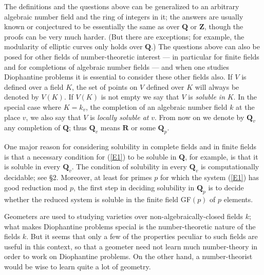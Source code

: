 \documentclass[12pt]{article}
\def\bQ{{\mathbf Q}}
\def\bR{{\mathbf R}}
\def\bZ{{\mathbf Z}}
\begin{document}
The definitions and the questions above can be generalized to an arbitrary
algebraic number field and the ring of integers in it; the answers are
usually known or conjectured to be essentially the same as over $\bQ$ or
$\bZ$, though the proofs can be very much harder. (But there are exceptions;
for example, the modularity of elliptic curves only holds over $\bQ$.)
The questions above can also be posed for other fields of
number-theoretic interest --- in particular for finite fields and for
completions of algebraic number fields --- and when one studies Diophantine
problems it is essential to consider these other fields also.
If $V$ is defined over a field $K$, the set of points on $V$ defined over $K$
will always be denoted by $V(K)$. If $V(K)$ is not empty we say that $V$ is
\emph{soluble in} $K$. In the special case where $K=k_v$, the completion of
an algebraic number field $k$ at the place $v$, we also say that $V$ is
\emph{locally soluble at} $v$. From now on we denote by
$\bQ_v$ any completion of $\bQ$; thus $\bQ_v$ means $\bR$ or some $\bQ_p$.

One major reason for considering solubility in complete fields and in finite
fields
is that a necessary condition for (\ref{E1}) to be soluble in $\bQ$, for
example, is that it is soluble in every $\bQ_v$.
The condition of solubility in every $\bQ_v$ is computationally decidable;
see \S2. Moreover, at least for primes $p$
for which the system (\ref{E1}) has good reduction mod $p$, the first step
in deciding solubility in $\bQ_p$ is to decide whether the reduced
system is soluble in the finite field GF$(p)$ of $p$ elements.

Geometers are used to studying varieties
over non-algebraically-closed fields $k$; what makes Diophantine problems
special is the number-theoretic nature of the fields $k$.
But it seems that only a few of the properties peculiar to such fields
are useful in this context, so that a geometer need not learn much
number-theory in order to work on Diophantine problems. On the other hand,
a number-theorist would be wise to learn quite a lot of geometry.
\end{document}
